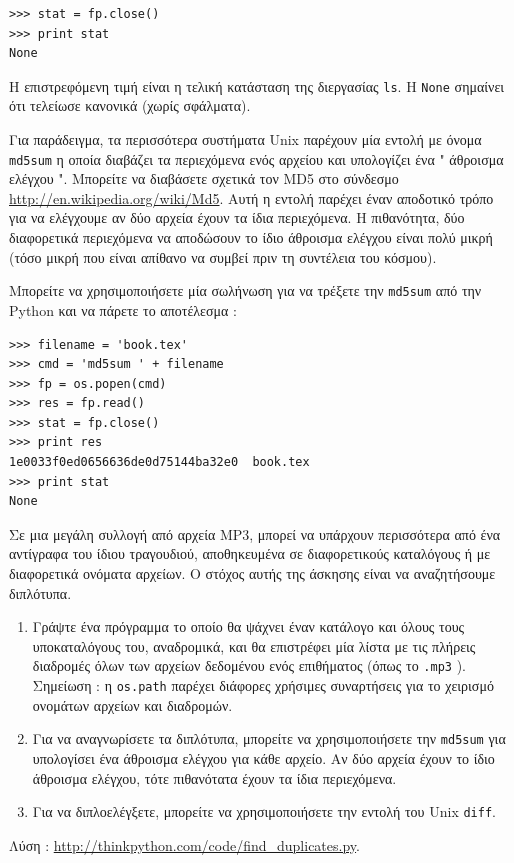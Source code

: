 \documentclass[10pt]{book}
\begin{document}
\begin{verbatim}
>>> stat = fp.close()
>>> print stat
None
\end{verbatim}
%
 Η επιστρεφόμενη τιμή είναι η τελική κατάσταση της διεργασίας  {\tt ls}.  Η  {\tt None}  σημαίνει ότι τελείωσε κανονικά (χωρίς σφάλματα).

Για παράδειγμα, τα περισσότερα συστήματα  Unix  παρέχουν μία εντολή με όνομα  {\tt md5sum}  η οποία διαβάζει τα περιεχόμενα ενός αρχείου και υπολογίζει ένα  " άθροισμα ελέγχου ".  Μπορείτε να διαβάσετε σχετικά τον  MD5  στο 
σύνδεσμο  \url{http://en.wikipedia.org/wiki/Md5}.  Αυτή η εντολή παρέχει έναν αποδοτικό τρόπο για να ελέγχουμε αν δύο αρχεία 
έχουν τα ίδια περιεχόμενα. Η πιθανότητα, δύο διαφορετικά περιεχόμενα να αποδώσουν το ίδιο άθροισμα ελέγχου είναι πολύ μικρή (τόσο μικρή που είναι απίθανο να συμβεί πριν τη συντέλεια του κόσμου).

Μπορείτε να χρησιμοποιήσετε μία σωλήνωση για να τρέξετε την  {\tt md5sum}  από την  Python  και να πάρετε το αποτέλεσμα :

\begin{verbatim}
>>> filename = 'book.tex'
>>> cmd = 'md5sum ' + filename
>>> fp = os.popen(cmd)
>>> res = fp.read()
>>> stat = fp.close()
>>> print res
1e0033f0ed0656636de0d75144ba32e0  book.tex
>>> print stat
None
\end{verbatim}


\begin{exercise}
\label{checksum}

Σε μια μεγάλη συλλογή από αρχεία  MP3,  μπορεί να υπάρχουν περισσότερα από ένα αντίγραφα του ίδιου τραγουδιού, αποθηκευμένα 
σε διαφορετικούς καταλόγους ή με διαφορετικά ονόματα αρχείων. Ο στόχος αυτής της άσκησης είναι να αναζητήσουμε διπλότυπα.

 
\begin{enumerate}

\item  Γράψτε ένα πρόγραμμα το οποίο θα ψάχνει έναν κατάλογο και όλους τους υποκαταλόγους του, αναδρομικά, και θα επιστρέφει μία λίστα με τις πλήρεις διαδρομές όλων των αρχείων δεδομένου ενός επιθήματος (όπως το  {\tt .mp3} ). Σημείωση :  η  {\tt os.path}  παρέχει διάφορες χρήσιμες συναρτήσεις για το χειρισμό ονομάτων αρχείων και διαδρομών.

\item  Για να αναγνωρίσετε τα διπλότυπα, μπορείτε να χρησιμοποιήσετε την {\tt md5sum} για υπολογίσει ένα άθροισμα ελέγχου για κάθε αρχείο. Αν δύο αρχεία έχουν το ίδιο άθροισμα ελέγχου, τότε πιθανότατα έχουν τα ίδια περιεχόμενα. 

\item  Για να διπλοελέγξετε, μπορείτε να χρησιμοποιήσετε την εντολή του  Unix {\tt diff}.

\end{enumerate}
 
Λύση : \url{http://thinkpython.com/code/find_duplicates.py}.
\end{exercise}
\end{document}
